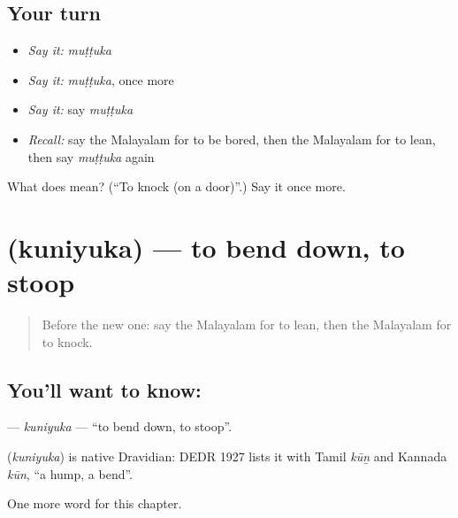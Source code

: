 \subsection*{Your turn}
\begin{itemize}
\raggedright
  \item \emph{Say it:} \emph{muṭṭuka}
  \item \emph{Say it:} \emph{muṭṭuka}, once more
  \item \emph{Say it:} say \emph{muṭṭuka}
  \item \emph{Recall:} say the Malayalam for to be bored, then the Malayalam for to lean, then say \emph{muṭṭuka} again
\end{itemize}

\begin{tcolorbox}[breakable,colback=teal!4,colframe=teal!35!black,title={Before you move on}]
What does  mean? (\textquotedblleft{}To knock (on a door)\textquotedblright{}.) Say it once more.
\end{tcolorbox}
\section[\texorpdfstring{\ml{കുനിയുക} (kuniyuka)}{കുനിയുക (kuniyuka)}]{ (kuniyuka) — to bend down, to stoop}

\label{lesson:ML-C231-kuniyuka}



\begin{quote}
Before the new one: say the Malayalam for to lean, then the Malayalam for to knock.
\end{quote}

\subsection*{You'll want to know: }
\textbf{} — \emph{kuniyuka} — \textquotedblleft{}to bend down, to stoop\textquotedblright{}.

\begin{cousinweb}
\textbf{} (\emph{kuniyuka}) is native Dravidian: DEDR 1927 lists it with Tamil \emph{kūṉ} and Kannada \emph{kūn}, \textquotedblleft{}a hump, a bend\textquotedblright{}.
\end{cousinweb}

\begin{grammarlens}[title={What you've built}]
One more word for this chapter.
\end{grammarlens}

